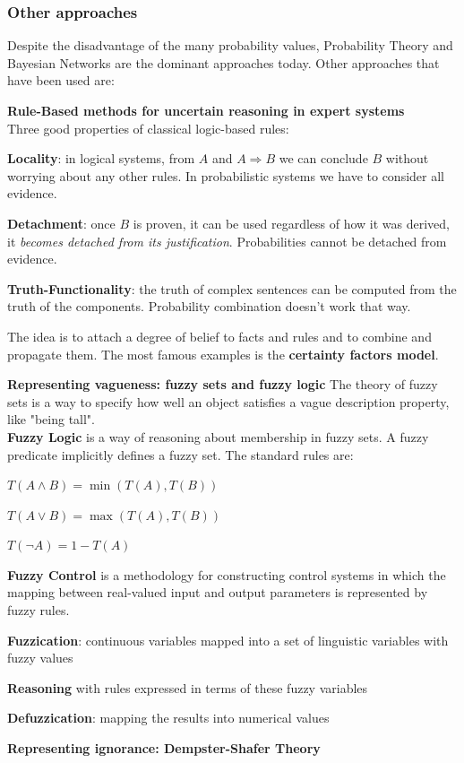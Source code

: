 \documentclass[10pt]{report}
\begin{document}
\subsubsection{Other approaches}
Despite the disadvantage of the many probability values, Probability Theory and Bayesian Networks are the dominant approaches today. Other approaches that have been used are:
\begin{list}{}{}
	\item \textbf{Rule-Based methods for uncertain reasoning in expert systems}\\
	Three good properties of classical logic-based rules:
	\begin{list}{}{}
		\item \textbf{Locality}: in logical systems, from $A$ and $A\Rightarrow B$ we can conclude $B$ without worrying about any other rules. In probabilistic systems we have to consider all evidence.
		\item \textbf{Detachment}: once $B$ is proven, it can be used regardless of how it was derived, it \textit{becomes detached from its justification}. Probabilities cannot be detached from evidence.
		\item \textbf{Truth-Functionality}: the truth of complex sentences can be computed from the truth of the components. Probability combination doesn't work that way.
	\end{list}
	The idea is to attach a degree of belief to facts and rules and to combine and propagate them. The most famous examples is the \textbf{certainty factors model}.
	\item \textbf{Representing vagueness: fuzzy sets and fuzzy logic}
		The theory of fuzzy sets is a way to specify how well an object satisfies a vague description property, like "being tall".\\
		\textbf{Fuzzy Logic} is a way of reasoning about membership in fuzzy sets. A fuzzy predicate implicitly defines a fuzzy set. The standard rules are:
		\begin{list}{}{}
			\item $T(A\wedge B) = \min(T(A),T(B))$
			\item $T(A\vee B) = \max(T(A),T(B))$
			\item $T(\neg A) = 1-T(A)$
		\end{list}
		\textbf{Fuzzy Control} is a methodology for constructing control systems in which the mapping between real-valued input and output parameters is represented by fuzzy rules.
		\begin{list}{}{}
			\item \textbf{Fuzzication}: continuous variables mapped into a set of linguistic variables with fuzzy values
			\item \textbf{Reasoning} with rules expressed in terms of these fuzzy variables
			\item \textbf{Defuzzication}: mapping the results into numerical values
		\end{list}
	\item \textbf{Representing ignorance: Dempster-Shafer Theory}
\end{list}
\end{document}
